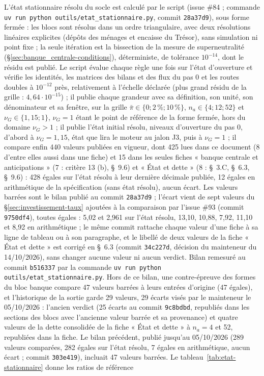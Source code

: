 \documentclass[11pt,a4paper]{article}
\newcommand{\code}[1]{\texttt{\detokenize{#1}}}
\newcommand{\barre}[1]{\leavevmode\sbox{\boitebarre}{#1}\rlap{\rule[0.6ex]{\wd\boitebarre}{0.4pt}}\usebox{\boitebarre}}
\begin{document}
\begin{proposee}
L'état stationnaire résolu du socle est calculé par le script \code{outils/etat_stationnaire.py} (issue \#84 ; commande \texttt{uv run python outils/etat\_stationnaire.py}, commit \texttt{28a37d9}), sous forme fermée : les blocs sont résolus dans un ordre triangulaire, avec deux résolutions linéaires explicites (dépôts des ménages et encaisse du Trésor), sans simulation ni point fixe ; la seule itération est la bissection de la mesure de superneutralité (\S\ref{sec:banque_centrale-conditions}), déterministe, de tolérance $10^{-14}$, dont le résidu est publié. Le script évalue chaque règle une fois sur l'état d'ouverture et vérifie les identités, les matrices des bilans et des flux du pas 0 et les routes doubles à $10^{-12}$ près, relativement à l'échelle déclarée (plus grand résidu de la grille : $4{,}64 \cdot 10^{-15}$) ; il publie chaque grandeur avec sa définition, son unité, son dénominateur et sa fenêtre, sur la grille $\bar\pi \in \{0 ; 2\,\% ; 10\,\%\}$, $n_a \in \{4 ; 12 ; 52\}$ et $\nu_G \in \{1{,}15 ; 1\}$, $\nu_G = 1$ étant le point de référence de la forme fermée, hors du domaine $\nu_G > 1$ ; il publie l'état initial résolu, niveaux d'ouverture du pas 0, d'abord à $\nu_G = 1{,}15$, état que lira le moteur au jalon J3, puis à $\nu_G = 1$ ; il compare enfin \barre{433} 440 valeurs publiées en vigueur, dont \barre{418} 425 lues dans ce document (8 d'entre elles aussi dans une fiche) et 15 dans les seules fiches « banque centrale et anticipations » (7 : critère 13 (b), \S~9.6) et « État et dette » (8 : \S~3.C, \S~6.3, \S~9.6) : \barre{426} 428 égales sur l'état résolu à leur dernière décimale publiée, \barre{7} 12 égales en arithmétique de la spécification (sans état résolu), aucun écart. Les valeurs barrées sont le bilan publié au commit \texttt{28a37d9} ; l'écart vient de sept valeurs du \S\ref{sec:investissement-taux} ajoutées à la comparaison par l'issue \#93 (commit \texttt{9750df4}), toutes égales : 5,02 et 2,961 sur l'état résolu, 13,10, 10,88, 7,92, 11,10 et 8,92 en arithmétique ; le même commit rattache chaque valeur d'une fiche à sa ligne de tableau ou à son paragraphe, et le libellé de deux valeurs de la fiche « État et dette » est corrigé en \S~6.3 (commit \texttt{34c227d}, décision du mainteneur du 14/10/2026), sans changer aucune valeur ni aucun verdict. Bilan remesuré au commit \texttt{b516337} par la commande \texttt{uv run python outils/etat\_stationnaire.py}. Hors de ce bilan, une contre-épreuve des formes du bloc banque compare 47 valeurs barrées à leurs entrées d'origine (47 égales), et l'historique de la sortie garde 29 valeurs, 29 écarts visés par le mainteneur le 05/10/2026 : l'ancien verdict (25 écarts au commit \texttt{9c8bdbd}, republiés dans les sections des blocs avec l'ancienne valeur barrée et sa provenance) et quatre valeurs de la dette consolidée de la fiche « État et dette » à $n_a = 4$ et 52, republiées dans la fiche. Le bilan précédent, publié jusqu'au 05/10/2026 (289 valeurs comparées, 282 égales sur l'état résolu, 7 égales en arithmétique, aucun écart ; commit \texttt{303e419}), incluait 47 valeurs barrées. Le tableau~\ref{tab:etat-stationnaire} donne les ratios de référence 
\end{proposee}
\end{document}
